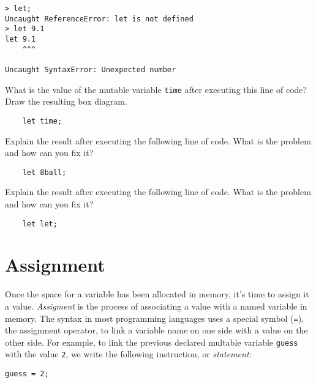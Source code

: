 \begin{lstlisting}[caption={\label{listing:intro-let-syntax-error}Several illegal uses of the keyword \texttt{let}.}]
> let;
Uncaught ReferenceError: let is not defined
> let 9.1
let 9.1
    ^^^

Uncaught SyntaxError: Unexpected number
\end{lstlisting}

\begin{question}
  What is the value of the mutable variable \texttt{time} after executing this line of code? Draw the resulting box diagram.
  \begin{lstlisting}
    let time;
  \end{lstlisting}
\end{question}

\begin{question}
  Explain the result after executing the following line of code. What is the problem and how can you fix it?
  \begin{lstlisting}
    let 8ball;
  \end{lstlisting}
\end{question}

\begin{question}
  Explain the result after executing the following line of code. What is the problem and how can you fix it?
  \begin{lstlisting}
    let let;
  \end{lstlisting}
\end{question}

\section{Assignment}
Once the space for a variable has been allocated in memory, it's time to assign it a value. \emph{Assigment} is the process of associating a value with a named variable in memory. The syntax in most programming languages uses a special symbol (\texttt{=}), the assignment operator, to link a variable name on one side with a value on the other side.  For example, to link the previous declared multable variable \texttt{guess} with the value \texttt{2}, we write the following instruction, or \emph{statement}:

\begin{lstlisting}
guess = 2;
\end{lstlisting}

